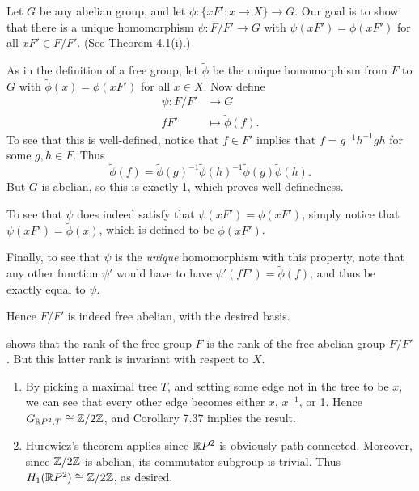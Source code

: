 \documentclass[../../solutions.tex]{subfiles}
\begin{document}
\begin{exercise} \leavevmode
Let $G$ be any abelian group, and let $\phi:\{xF':x\to X\}\to G$.
Our goal is to show that there is a unique homomorphism $\psi:F/F'\to G$ with $\psi(xF')=\phi(xF')$ for all $xF'\in F/F'$.
(See Theorem 4.1(i).)

As in the definition of a free group, let $\tilde\phi$ be the unique homomorphism from $F$ to $G$ with $\tilde\phi(x)=\phi(xF')$ for all $x\in X$.
Now define
\begin{align*}
\psi:F/F'&\to G\\ fF'&\mapsto\tilde\phi(f).
\end{align*}
To see that this is well-defined, notice that $f\in F'$ implies that $f=g^{-1}h^{-1}gh$ for some $g,h\in F$.
Thus
\[\tilde\phi(f)=\tilde\phi(g)^{-1}\tilde\phi(h)^{-1}\tilde\phi(g)\tilde\phi(h).\]
But $G$ is abelian, so this is exactly 1, which proves well-definedness.

To see that $\psi$ does indeed satisfy that $\psi(xF')=\phi(xF')$, simply notice that $\psi(xF')=\tilde\phi(x)$, which is defined to be $\phi(xF')$.

Finally, to see that $\psi$ is the \textit{unique} homomorphism with this property, note that any other function $\psi'$ would have to have $\psi'(fF')=\tilde\phi(f)$, and thus be exactly equal to $\psi$.

Hence $F/F'$ is indeed free abelian, with the desired basis.
\end{exercise}

\begin{exercise} \leavevmode
{} shows that the rank of the free group $F$ is the rank of the free abelian group $F/F'$.
But this latter rank is invariant with respect to $X$.
\end{exercise}

\begin{exercise} \leavevmode
\begin{enumerate}
\item
By picking a maximal tree $T$, and setting some edge not in the tree to be $x$, we can see that every other edge becomes either $x$, $x^{-1}$, or 1.
Hence $G_{\mathbb{R} P^2,T}\cong\mathbb{Z}/2\mathbb{Z}$, and Corollary 7.37 implies the result.

\item
Hurewicz's theorem applies since $\mathbb{R} P^2$ is obviously path-connected.
Moreover, since $\mathbb{Z}/2\mathbb{Z}$ is abelian, its commutator subgroup is trivial.
Thus $H_1(\mathbb{R} P^2)\cong\mathbb{Z}/2\mathbb{Z}$, as desired.
\end{enumerate}
\end{exercise}
\end{document}
